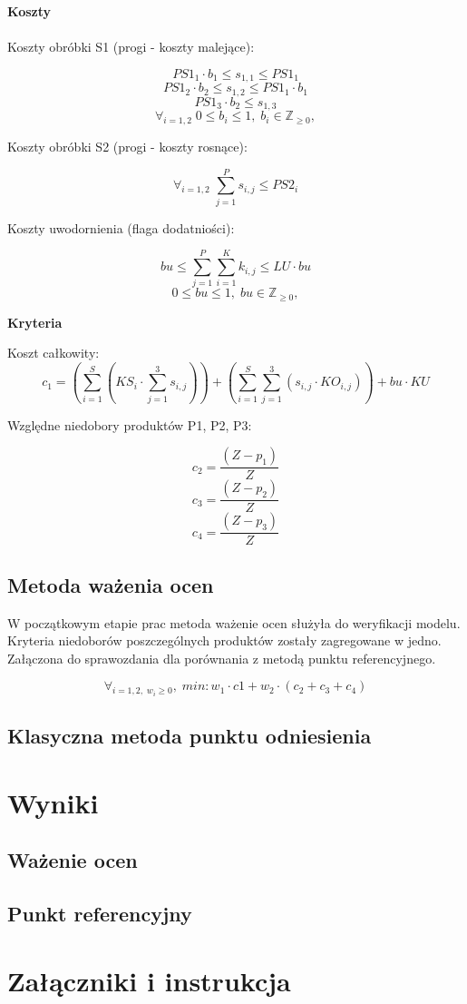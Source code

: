 \documentclass[a4paper, 10pt]{article}
\begin{document}
{\bf Koszty\\}
\hfill \\ 
Koszty obróbki S1 (progi - koszty malejące):

$$ PS1_{1}\cdot b_{1} \le s_{1,1} \le  PS1_{1}  $$
$$ PS1_{2}\cdot b_{2} \le s_{1,2} \le  PS1_{1}\cdot b_{1}  $$
$$ PS1_{3}\cdot b_{2} \le s_{1,3}   $$
$$ \forall_{i={1,2}}  \;  0 \le b_{i} \le 1,\;b_{i} \in \mathbb Z_{\ge 0},   $$

Koszty obróbki S2 (progi - koszty rosnące):

$$ \forall_{i={1,2}} \;  \sum_{j =1}^{P} s_{i,j} \le PS2_{i}$$

Koszty uwodornienia (flaga dodatniości):

$$  bu \le 	\sum_{j=1}^{P}  \sum_{i=1}^{K} k_{i,j}  \le LU \cdot bu $$
$$   0 \le bu \le 1,\;bu \in \mathbb Z_{\ge 0},   $$


{\bf Kryteria\\}

Koszt całkowity:
$$ c_1 = (\sum_{i=1}^{S}( {KS}_i \cdot \sum_{j=1}^{3}s_{i,j}))  + (\sum_{i=1}^{S} \sum_{j=1}^{3}(s_{i,j}\cdot KO_{i,j})) + bu\cdot KU$$

Względne niedobory produktów P1, P2, P3:

$$ c_2 = \frac{(Z - p_1)}{Z} $$
$$ c_3 = \frac{(Z - p_2)}{Z} $$
$$ c_4 = \frac{(Z - p_3)}{Z} $$




\subsection{Metoda ważenia ocen}

W początkowym etapie prac metoda ważenie ocen służyła do weryfikacji modelu. Kryteria niedoborów poszczególnych produktów zostały zagregowane w jedno.
Załączona do sprawozdania dla porównania z metodą punktu referencyjnego.

$$ \forall_{i={1,2},\; w_i \ge 0} , \; min: w_1 \cdot c1+w_2 \cdot (c_2+c_3+c_4) $$





\subsection{Klasyczna metoda punktu odniesienia}

\section{Wyniki}

\subsection{Ważenie ocen}

\subsection{Punkt referencyjny}


\section{Załączniki i instrukcja}
\end{document}
